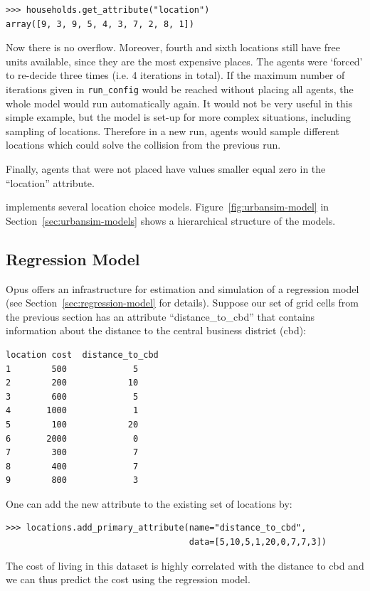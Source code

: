 \attributesindex
\begin{verbatim}
>>> households.get_attribute("location")
array([9, 3, 9, 5, 4, 3, 7, 2, 8, 1])
\end{verbatim}
Now there is no overflow. Moreover, fourth and sixth locations still have free
units available, since they are the most expensive places. The agents were `forced'
to re-decide three times (i.e. 4 iterations in total). If the maximum
number of iterations given in \verb|run_config| would be reached without
placing all agents, the whole model would run automatically again. It would not be
very useful in this simple example, but the model is set-up for more complex situations,
including sampling of locations. Therefore in a new run, agents would sample
different locations which could solve the collision from the previous run.

Finally, agents that were not
placed have values smaller equal zero in the ``location'' attribute. \attributesindex

 implements several location choice models.
Figure~\ref{fig:urbansim-model} in Section~\ref{sec:urbansim-models} shows
a hierarchical structure of the models.


%
\subsection{Regression Model}
%
\label{sec:RM}
%
Opus offers an infrastructure for estimation and simulation of a regression model
(see Section~\ref{sec:regression-model} for details).
Suppose our set of grid cells from the previous section has an attribute
``distance_to_cbd'' that contains information about the distance to the
central business district (cbd):

\begin{verbatim}
location cost  distance_to_cbd
1        500             5
2        200            10
3        600             5
4       1000             1
5        100            20
6       2000             0
7        300             7
8        400             7
9        800             3
\end{verbatim}

One can add the new attribute to the existing set of locations by:
\begin{verbatim}
>>> locations.add_primary_attribute(name="distance_to_cbd",
                                    data=[5,10,5,1,20,0,7,7,3])
\end{verbatim}

The cost of living in this dataset is highly correlated with
the distance to cbd and we can thus predict the cost using the regression model.

